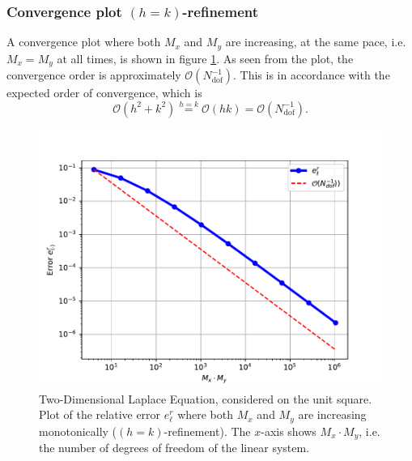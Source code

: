 \subsubsection*{Convergence plot $(h = k)$-refinement}

A convergence plot where both $M_x$ and $M_y$ are increasing, at the same pace, i.e. $M_x = M_y$ at all times, is shown in figure \ref{task3bConvergenceBothVary}. As seen from the plot, the convergence order is approximately $\mathcal{O}(N_{\mathrm{dof}}^{-1})$. This is in accordance with the expected order of convergence, which is
\begin{equation*}
    \mathcal{O}(h^2+k^2) \overset{h = k} = \mathcal{O}(hk) = \mathcal{O}(N_{\mathrm{dof}}^{-1}).
\end{equation*}

\begin{figure}[t]
    \centering
    \includegraphics[width=0.85\linewidth]{plots/task3bBothVary.pdf}
    \caption{Two-Dimensional Laplace Equation, considered on the unit square. Plot of the relative error $e^r_{\ell}$ where both $M_x$ and $M_y$ are increasing monotonically ($(h=k)$-refinement). The $x$-axis shows $M_x \cdot M_y$, i.e. the number of degrees of freedom of the linear system.}
    \label{task3bConvergenceBothVary}
\end{figure}
\newpage
\ 
\newpage
\newpage
\ 
\newpage
